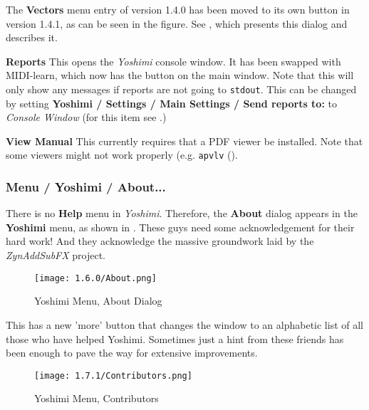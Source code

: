    The \textbf{Vectors} menu entry of version 1.4.0 has been moved to its own
   button in version 1.4.1, as can be seen in the figure.  See
   , which presents this dialog and
   describes it.

   \textbf{Reports} This opens the \textsl{Yoshimi} console window.
   It has been swapped with MIDI-learn, which now has the button on the main window.
   Note that this will only show any messages if reports are not going to
   \texttt{stdout}. This can be changed by setting \textbf{Yoshimi / Settings
   / Main Settings / Send reports to:} to \textsl{Console Window}
   (for this item see
   .)

%

   \textbf{View Manual} This currently requires that a PDF viewer
   be installed.
   Note that some viewers might not work properly
   (e.g. \texttt{apvlv} (\cite{apvlv}).

\subsubsection{Menu / Yoshimi / About...}
\label{subsubsec:menu_yoshimi_about}

   There is no \textbf{Help} menu in \textsl{Yoshimi}.  Therefore, the
   \textbf{About} dialog appears in the \textbf{Yoshimi} menu, as shown in
   .
   These guys need some acknowledgement for their hard work!
   And they acknowledge the massive groundwork laid by the
   \textsl{ZynAddSubFX} project.

\begin{figure}[H]
   \centering
   \texttt{[image: 1.6.0/About.png]}
   \caption{Yoshimi Menu, About Dialog}
   \label{fig:yoshimi_about_dialog}
\end{figure}
    This has a new 'more' button that changes the window to an alphabetic list of
    all those who have helped Yoshimi. Sometimes just a hint from these friends
    has been enough to pave the way for extensive improvements.
\begin{figure}[H]
   \centering
   \texttt{[image: 1.7.1/Contributors.png]}
   \caption{Yoshimi Menu, Contributors}
   \label{fig:yoshimi_contributors}
\end{figure}

